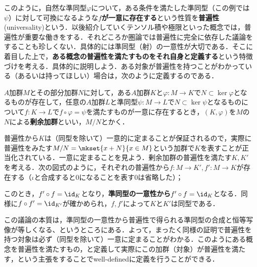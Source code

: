 このように，自然な準同型$\varphi$について，ある条件を満たした準同型（この例では$\psi$）に対して可換になるような\textbf{$f$が一意に存在する}という性質を\textbf{普遍性}(universality)という．以後紹介していくテンソル積や極限といった概念では，普遍性が重要な働きをする．それどころか圏論では普遍性に完全に依存した議論をすることも珍しくない．具体的には準同型（射）の一意性が大切である．そこに着目した上で，\textbf{ある概念の普遍性を満たすものをそれ自身と定義する}という特徴づけを考える．具体的に説明しよう．ある対象が普遍性を持つことがわかっている（あるいは持ってほしい）場合は，次のように定義するのである．

\begin{defi}[普遍性による剰余加群の定義]
	$A$加群$M$とその部分加群$N$に対して，ある$A$加群$K$と$\varphi:M\to K$で$N\subset\ker\varphi$となるものが存在して，任意の$A$加群$L$と準同型$\psi:M\to L$で$N\subset\ker\psi$となるものについて$f:K\to L$で$f\circ\varphi=\psi$を満たすものが一意に存在するとき，$(K,\varphi)$を$M$の$N$による\textbf{剰余加群}といい，$M/N$とかく．
\end{defi}

普遍性から$K$は（同型を除いて）一意的に定まることが保証されるので，実際に普遍性をみたす$M/N=\mkset{x+N}{x\in M}$という加群で$K$を表すことが正当化されている．一意に定まることを見よう．剰余加群の普遍性を満たす$K,K'$を考える．次の図式のように，それぞれの普遍性から$f:M\to K',f':M\to K$が存在する（$\iota$と合成すると$0$になることを表す$0$は省略した）；
\begin{figure}[H]
	\centering
	\caption{}
\end{figure}

このとき，$f'\circ f=\id_K$となり，\textbf{準同型の一意性から}$f'\circ f=\id_K$となる．同様に$f\circ f'=\id_{K'}$が確かめられ，$f,f'$によって$K$と$K'$は同型である．

この議論の本質は，準同型の一意性から普遍性で得られる準同型の合成と恒等写像が等しくなる、というところにある．よって，まったく同様の証明で普遍性を持つ対象は必ず（同型を除いて）一意に定まることがわかる．このようにある概念を普遍性を満たすもの，と定義して実際にこの加群（対象）が普遍性を満たす，という主張をすることでwell-definedに定義を行うことができる．

